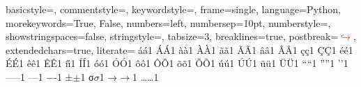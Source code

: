 \usepackage{subfigure} %

\usepackage{multicol} %
\usepackage{float} %
\usepackage[dvipsnames]{xcolor} %
\usepackage{amsmath} %
\usepackage[makeroom]{cancel} %
\usepackage{enumitem} %
\usepackage{amssymb} %
\usepackage[T1]{fontenc}
\usepackage{enumitem}
\usepackage{textcomp}
\usepackage{pdfpages} %
\usepackage{courier} %
\usepackage{lscape} %
\newtheorem{theorem}{Teorema} %
\newtheorem{corollary}{Corollary} %
\newtheorem{remark}{Remark}
\newtheorem{mytheorem}{Definition}
\usepackage{hyperref} %
\usepackage{multirow} %
\usepackage{pdfpages} %
\usepackage{listingsutf8} %
\usepackage{etoolbox}

\usepackage{standalone} %
\usepackage{bookmark} %

\renewcommand{\lstlistingname}{Listagem}




\lstset
{
    basicstyle=\small\ttfamily,
    commentstyle=\color{Green},
    keywordstyle=\color{Cerulean},
    frame=single,
    language=Python,
    morekeywords={True, False},
    numbers=left,
    numbersep=10pt,
    numberstyle=\footnotesize\color{Gray},
    showstringspaces=false,
    stringstyle=\color{Mulberry},
    tabsize=3,
    breaklines=true, %
    postbreak=\mbox{\textcolor{red}{$\hookrightarrow$}\space}, %
    extendedchars=true,
    literate=
        {á}{{\'a}}1 {Á}{{\'A}}1 {à}{{\`a}}1 {À}{{\`A}}1 {ã}{{\~a}}1 {Ã}{{\~A}}1 {â}{{\^a}}1 {Â}{{\^A}}1
        {ç}{{\c{c}}}1 {Ç}{{\c{C}}}1 {é}{{\'e}}1 {É}{{\'E}}1 {ê}{{\^e}}1 {Ê}{{\^E}}1 {í}{{\'\i}}1 {Í}{{\'I}}1
        {ó}{{\'o}}1 {Ó}{{\'O}}1 {ô}{{\^o}}1 {Ô}{{\^O}}1 {õ}{{\~o}}1 {Õ}{{\~O}}1 {ú}{{\'u}}1 {Ú}{{\'U}}1
        {ü}{{\"u}}1 {Ü}{{\"U}}1 {“}{{``}}1 {”}{{''}}1 {’}{{'}}1 {—}{{--}}1 {–}{{--}}1 {−}{{-}}1
        {±}{{$\pm$}}1 {σ}{{$\sigma$}}1 {→}{{$\to$}}1 {…}{{\ldots}}1
}

